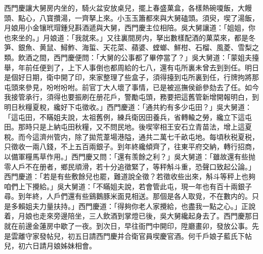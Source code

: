 西門慶讓大舅房内坐的，騎火盆安放桌兒，擺上春盛菓盒，各樣熱碗嗄飯，大饅頭、點心，八寳攢湯，一齊拏上來。小玉玉簫都來與大舅磕頭。須臾，喫了湯飯，月娘用小金镶玳瑁鍾兒斟酒遞與大舅，西門慶主位相陪。吳大舅讓道：「姐姐，你也來坐的。」月娘道：「我就來。」又往裏間房内，拏出數樣配酒的菓菜來，都是冬笋、銀魚、黄鼠、鱘鮓、海蜇、天花菜、蘋婆、螳螂、鮮柑、石榴、風菱、雪梨之類。飲酒之間，西門慶便問：「大舅的公事都了畢停當了？」吳大舅道：「蒙姐夫擡舉，年前任便到了，上下人事倒也都周給的七八，還有屯所裏未曾去到到任。明日是個好日期，衛中開了印，來家整理了些盒子，須得擡到屯所裏到任，行牌拘將那屯頭來參見，吩咐吩咐。前官丁大人壞了事情，已是被巡撫侯爺參劾去了任。如今我接管承行，須得也要振刷在册花戶，警勵屯頭，務要把這舊管新增開報明白，到明日秋糧夏稅，纔好下屯徵收。」西門慶道：「通共約有多少屯田？」吳大舅道：「這屯田，不瞞姐夫說，太祖舊例，練兵衛因田養兵，省轉輸之勞，纔立下這屯田。那時只是上納屯田秋糧，又不問民地。後喫宰相王安石立青苗法，增上這夏稅。而今這濟州管内，除了拋荒葦場港隘，通共二萬七千畝屯地。每頃秋税夏税，只徵收一兩八錢，不上五百兩銀子。到年終纔傾齊了，往東平府交納，轉行招商，以備軍糧馬草作用。」西門慶又問：「還有羡餘之利？」吳大舅道：「雖故還有些抛零人戶不在册者，鄉民頑滑，若十分追徵緊了，等秤斛斗重，恐聲口致起公論。」西門慶道：「若是有些敷餘兒也罷，難道說全徵？若徵收些出來，斛斗等秤上也夠咱們上下攪給。」吳大舅道：「不瞞姐夫說，若會管此屯，現一年也有百十兩銀子尋。到年終，人戶們還有些鷄鵝豚米面見相送。那個是各人取覓，不在數内的。只是多賴姐夫力量扶持。」西門慶道：「得夠你老人家攪給，也盡我一點之心。」正說着，月娘也走來旁邊陪坐，三人飲酒到掌燈已後，吳大舅纔起身去了。西門慶那日就在前邊金蓮房中歇了一夜。到次日，早往衙門中開印，陞廳畫卯，發放公事。先是雲離守家發帖兒，初五日請西門慶并合衛官員喫慶官酒。何千戶娘子藍氏下帖兒，初六日請月娘姊妹相會。

